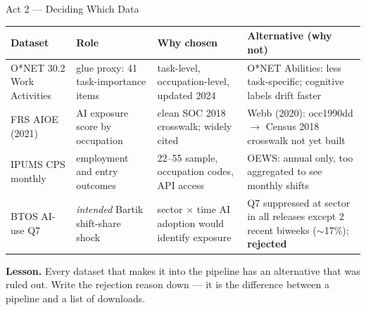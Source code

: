 \documentclass[10pt,english,aspectratio=169]{beamer}
\begin{document}
\begin{frame}{Act 2 --- Deciding Which Data}
\scriptsize
\begin{tabular}{p{2.2cm}p{2.2cm}p{3.4cm}p{4.4cm}}
\toprule
\textbf{Dataset} & \textbf{Role} & \textbf{Why chosen} & \textbf{Alternative (why not)} \\
\midrule
O*NET 30.2 Work Activities & glue proxy: 41 task-importance items & task-level, occupation-level, updated 2024 & O*NET Abilities: less task-specific; cognitive labels drift faster \\
FRS AIOE (2021) & AI exposure score by occupation & clean SOC 2018 crosswalk; widely cited & Webb (2020): occ1990dd $\to$ Census 2018 crosswalk not yet built \\
IPUMS CPS monthly & employment and entry outcomes & 22--55 sample, occupation codes, API access & OEWS: annual only, too aggregated to see monthly shifts \\
BTOS AI-use Q7 & \emph{intended} Bartik shift-share shock & sector $\times$ time AI adoption would identify exposure & Q7 suppressed at sector in all releases except 2 recent biweeks ($\sim$17\%); \textbf{rejected} \\
\bottomrule
\end{tabular}

\vspace{0.3cm}
\begin{tcolorbox}[colback=blue!3,colframe=RedTitle!60]
\textbf{Lesson.} Every dataset that makes it into the pipeline has an alternative that was ruled out. Write the rejection reason down --- it is the difference between a pipeline and a list of downloads.
\end{tcolorbox}
\end{frame}
\end{document}
